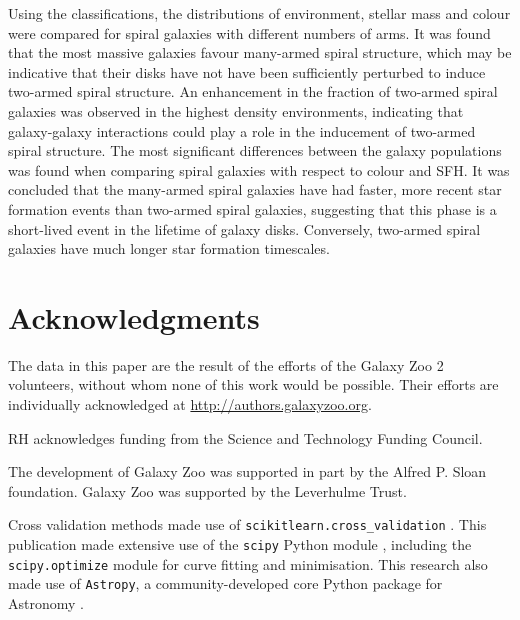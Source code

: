 \documentclass[useAMS,usenatbib]{mn2e}
\begin{document}
Using the classifications, the distributions of environment, stellar mass and colour were compared for spiral galaxies with different numbers of arms. It was found that the most massive galaxies favour many-armed spiral structure, which may be indicative that their disks have not have been sufficiently perturbed to induce two-armed spiral structure. An enhancement in the fraction of two-armed spiral galaxies was observed in the highest density environments, indicating that galaxy-galaxy interactions could play a role in the inducement of two-armed spiral structure. The most significant differences between the galaxy populations was found when comparing spiral galaxies with respect to colour and SFH. It was concluded that the many-armed spiral galaxies have had faster, more recent star formation events than two-armed spiral galaxies, suggesting that this phase is a short-lived event in the lifetime of galaxy disks. Conversely, two-armed spiral galaxies have much longer star formation timescales.


\section{Acknowledgments}

The data in this paper are the result of the efforts of the Galaxy Zoo 2 volunteers, without whom none of this work would be possible. Their efforts are individually acknowledged at \url{http://authors.galaxyzoo.org}.

RH acknowledges funding from the Science and Technology Funding Council.

The development of Galaxy Zoo was supported in part by the Alfred P. Sloan foundation. Galaxy Zoo was supported by the Leverhulme Trust.

Cross validation methods made use of \texttt{scikitlearn.cross\_validation} \citep{scikit-learn}. This publication made extensive use of the \texttt{scipy} Python module \citep{scipy}, including the \texttt{scipy.optimize} module for curve fitting and minimisation. This research also made use of \texttt{Astropy}, a community-developed core Python package for Astronomy \citep{astropy}.



\end{document}
